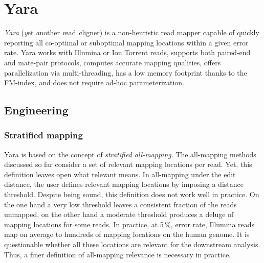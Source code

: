\chapter{Yara}
\label{sec:yara}

\emph{Yara} (\emph{y}et \emph{a}nother \emph{r}ead \emph{a}ligner) is a non-heuristic read mapper capable of quickly reporting all co-optimal or suboptimal mapping locations within a given error rate.
Yara works with Illumina or Ion Torrent reads, supports both paired-end and mate-pair protocols, computes accurate mapping qualities, offers parallelization via multi-threading, has a low memory footprint thanks to the FM-index, and does not require ad-hoc parameterization.


\section{Engineering}
\label{sec:yara:eng}

\subsection{Stratified mapping}
\label{sec:yara:eng:strata}

Yara is based on the concept of \emph{stratified all-mapping}.
The all-mapping methods discussed so far consider a set of relevant mapping locations per read.
Yet, this definition leaves open what relevant means.
In all-mapping under the edit distance, the user defines relevant mapping locations by imposing a distance threshold.
Despite being sound, this definition does not work well in practice.
On the one hand a very low threshold leaves a consistent fraction of the reads unmapped, on the other hand a moderate threshold produces a deluge of mapping locations for some reads.
In practice, at 5\,\%, error rate, Illumina reads map on average to hundreds of mapping locations on the human genome.
It is questionable whether all these locations are relevant for the downstream analysis.
Thus, a finer definition of all-mapping relevance is necessary in practice.


